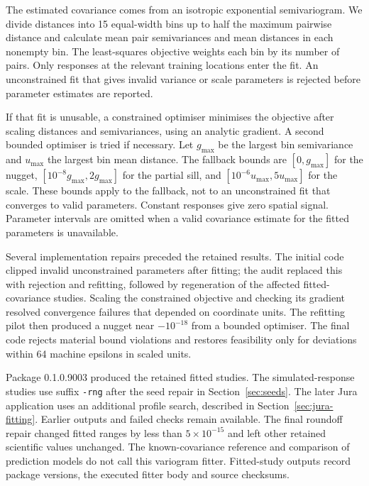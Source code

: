 \documentclass[11pt,a4paper]{article}
\begin{document}
The estimated covariance comes from an isotropic exponential semivariogram. We divide distances into 15 equal-width bins up to half the maximum pairwise distance and calculate mean pair semivariances and mean distances in each nonempty bin. The least-squares objective weights each bin by its number of pairs. Only responses at the relevant training locations enter the fit. An unconstrained fit that gives invalid variance or scale parameters is rejected before parameter estimates are reported.

If that fit is unusable, a constrained optimiser minimises the objective after scaling distances and semivariances, using an analytic gradient. A second bounded optimiser is tried if necessary. Let $g_{\max}$ be the largest bin semivariance and $u_{\max}$ the largest bin mean distance. The fallback bounds are $[0,g_{\max}]$ for the nugget, $[10^{-8}g_{\max},2g_{\max}]$ for the partial sill, and $[10^{-6}u_{\max},5u_{\max}]$ for the scale. These bounds apply to the fallback, not to an unconstrained fit that converges to valid parameters. Constant responses give zero spatial signal. Parameter intervals are omitted when a valid covariance estimate for the fitted parameters is unavailable.

Several implementation repairs preceded the retained results. The initial code clipped invalid unconstrained parameters after fitting; the audit replaced this with rejection and refitting, followed by regeneration of the affected fitted-covariance studies. Scaling the constrained objective and checking its gradient resolved convergence failures that depended on coordinate units. The refitting pilot then produced a nugget near $-10^{-18}$ from a bounded optimiser. The final code rejects material bound violations and restores feasibility only for deviations within 64 machine epsilons in scaled units.

Package 0.1.0.9003 produced the retained fitted studies. The simulated-response studies use suffix \texttt{-rng} after the seed repair in Section~\ref{sec:seeds}. The later Jura application uses an additional profile search, described in Section~\ref{sec:jura-fitting}. Earlier outputs and failed checks remain available. The final roundoff repair changed fitted ranges by less than $5\times10^{-15}$ and left other retained scientific values unchanged. The known-covariance reference and comparison of prediction models do not call this variogram fitter. Fitted-study outputs record package versions, the executed fitter body and source checksums.
\end{document}
